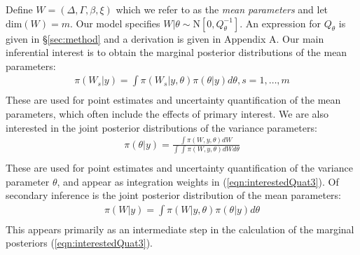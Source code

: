 \documentclass[AMA,STIX1COL,doublespace]{WileyNJD-v2}
\begin{document}
Define $W = \left(\Delta, \Gamma,\beta, \xi \right)$ which we refer to as the \textit{mean parameters} and let $\text{dim}(W) = m$. Our model specifies $W|\theta\sim\text{N}\left[ 0,Q^{-1}_{\theta}\right]$. An expression for $Q_{\theta}$ is given in \S\ref{sec:method} and a derivation is given in Appendix A. Our main inferential interest is to obtain the marginal posterior distributions of the mean parameters:
\begin{equation}\begin{aligned}\label{eqn:interestedQuat3}
\pi(W_{s}|y) = \int \pi(W_{s}|y,\theta) \pi(\theta|y) d\theta, s = 1,\ldots,m  \\
\end{aligned}\end{equation}
These are used for point estimates and uncertainty quantification of the mean parameters, which often include the effects of primary interest. We are also interested in the joint posterior distributions of the variance parameters:
\begin{equation}\begin{aligned}\label{eqn:interestedQuat1}
\pi(\theta|y) = \frac{\int \pi(W,y,\theta) dW}{\int_{} \int_{} \pi(W,y,\theta) dW d\theta } \\
\end{aligned}\end{equation}
These are used for point estimates and uncertainty quantification of the variance parameter $\theta$, and appear as integration weights in (\ref{eqn:interestedQuat3}). Of secondary inference is the joint posterior distribution of the mean parameters:
\begin{equation}\begin{aligned}\label{eqn:interestedQuat2}
\pi(W|y) = \int \pi(W|y,\theta) \pi(\theta|y) d\theta  \\
\end{aligned}\end{equation}
This appears primarily as an intermediate step in the calculation of the marginal posteriors (\ref{eqn:interestedQuat3}).
\end{document}
